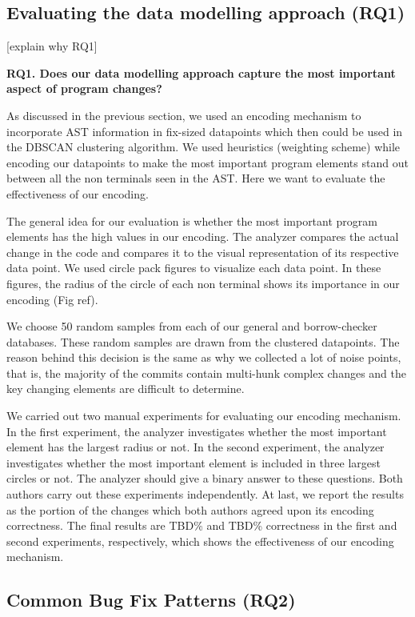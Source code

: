 \subsection{Evaluating the data modelling approach (RQ1)}

[explain why RQ1]

\textbf{RQ1. Does our data modelling approach capture the most important aspect of program changes?} 

As discussed in the previous section, we used an encoding mechanism to incorporate AST information in fix-sized datapoints which then could be used in the DBSCAN clustering algorithm. We used heuristics (weighting scheme) while encoding our datapoints to make the most important program elements stand out between all the non terminals seen in the AST. Here we want to evaluate the effectiveness of our encoding.

The general idea for our evaluation is whether the most important program elements has the high values in our encoding. The analyzer compares the actual change in the code and compares it to the visual representation of its respective data point. We used circle pack figures to visualize each data point. In these figures, the radius of the circle of each non terminal shows its importance in our encoding (Fig ref).

We choose 50 random samples from each of our general and borrow-checker databases. These random samples are drawn from the clustered datapoints. The reason behind this decision is the same as why we collected a lot of noise points, that is, the majority of the commits contain multi-hunk complex changes and the key changing elements are difficult to determine.

We carried out two manual experiments for evaluating our encoding mechanism. In the first experiment, the analyzer investigates whether the most important element has the largest radius or not. In the second experiment, the analyzer investigates whether the most important element is included in three largest circles or not. The analyzer should give a binary answer to these questions. Both authors carry out these experiments independently. At last, we report the results as the portion of the changes which both authors agreed upon its encoding correctness. The final results are TBD\% and TBD\% correctness in the first and second experiments, respectively, which shows the effectiveness of our encoding mechanism.

\subsection{Common Bug Fix Patterns (RQ2)}

